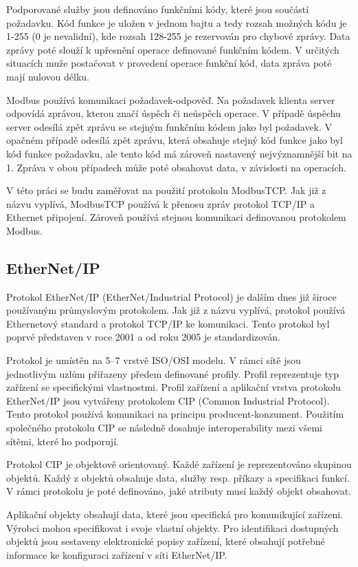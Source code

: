 Podporované služby jsou definováno funkčními kódy, které jsou součástí požadavku. Kód funkce je uložen v jednom bajtu a tedy rozsah možných kódu je 1-255 (0 je nevalidní), kde rozsah 128-255 je rezervován pro chybové zprávy. Data zprávy poté slouží k upřesnění operace definované funkčním kódem. V určitých situacích muže postačovat v provedení operace funkční kód, data zpráva poté mají nulovou délku.

Modbus používá komunikaci požadavek-odpověď. Na požadavek klienta server odpovídá zprávou, kterou značí úspěch či neúspěch operace. V případě úspěchu server odesílá zpět zprávu se stejným funkčním kódem jako byl požadavek. V opačném případě odesílá zpět zprávu, která obsahuje stejný kód funkce jako byl kód funkce požadavku, ale tento kód má zároveň nastavený nejvýznamnější bit na 1. Zpráva v obou případech může poté obsahovat data, v závislosti na operacích. \cite{modbus}

V této práci se budu zaměřovat na použití protokolu ModbusTCP. Jak již z názvu vyplívá, ModbusTCP používá k přenosu zpráv protokol TCP/IP a Ethernet připojení. Zároveň používá stejnou komunikaci definovanou protokolem Modbus.

\subsection{EtherNet/IP}
Protokol EtherNet/IP (EtherNet/Industrial Protocol) je dalším dnes již široce používaným průmyslovým protokolem. Jak již z názvu vyplívá, protokol používá Ethernetový standard a protokol TCP/IP ke komunikaci. Tento protokol byl poprvé představen v roce 2001 a od roku 2005 je standardizován. 

Protokol je umístěn na 5--7 vrstvě ISO/OSI modelu. V rámci sítě jsou jednotlivým uzlům přiřazeny předem definované profily. Profil reprezentuje typ zařízení se specifickými vlastnostmi. Profil zařízení a aplikační vrstva protokolu EtherNet/IP jsou vytvářeny protokolem CIP (Common Industrial Protocol). Tento protokol používá komunikaci na principu producent-konzument. Použitím společného protokolu CIP se následně dosahuje interoperability mezi všemi sítěmi, které ho podporují. 

Protokol CIP je objektově orientovaný. Každé zařízení je reprezentováno skupinou objektů. Každý z objektů obsahuje data, služby resp. příkazy a specifikaci funkcí. V rámci protokolu je poté definováno, jaké atributy musí každý objekt obsahovat.

Aplikační objekty obsahují data, které jsou specifická pro komunikující zařízeni. Výrobci mohou specifikovat i svoje vlastní objekty. Pro identifikaci dostupných objektů jsou sestaveny elektronické popisy zařízení, které obsahují potřebné informace ke konfiguraci zařízení v síti EtherNet/IP. 


